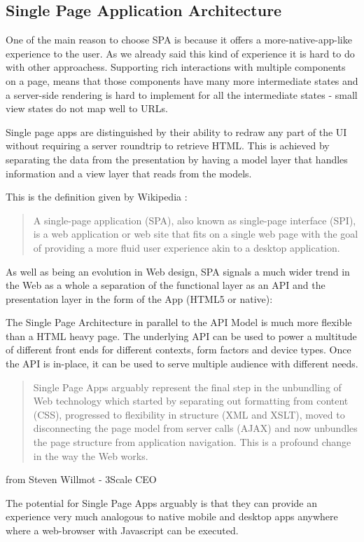 \documentclass[a4paper,13pt]{report}
\begin{document}
\subsection{Single Page Application Architecture}
 One of the main reason to choose SPA is because it offers a more-native-app-like experience to the user. As we already said this kind of experience it is hard to do with other approachess.
 Supporting rich interactions with multiple components on a page, means that those components have many more intermediate states and a server-side rendering is hard to implement for all the intermediate states - small view states do not map well to URLs.

Single page apps are distinguished by their ability to redraw any part of the UI without requiring a server roundtrip to retrieve HTML. This is achieved by separating the data from the presentation by having a model layer that handles information and a view layer that reads from the models.


This is the definition given by Wikipedia \cite{SPAWikipedia}:
\begin{quotation}
A single-page application (SPA), also known as single-page interface (SPI), is a web application or web site that fits on a single web page with the goal of providing a more fluid user experience akin to a desktop application.
\end{quotation}


As well as being an evolution in Web design, SPA signals a much wider trend in the Web as a whole a separation of the functional layer as an API and the presentation layer in the form of the App (HTML5 or native):

The Single Page Architecture in parallel to the API Model is much more flexible than a HTML heavy page. The underlying API can be used to power a multitude of different front ends for different contexts, form factors and device types. Once the API is in-place, it can be used to serve multiple audience with different needs. \newline
\begin{quotation}
Single Page Apps arguably represent the final step in the unbundling of Web technology which started by separating out formatting from content (CSS), progressed to flexibility in structure (XML and XSLT), moved to disconnecting the page model from server calls (AJAX) and now unbundles the page structure from application navigation. This is a profound change in the way the Web works.
\end{quotation}
\begin{flushright}
from Steven Willmot - 3Scale CEO\cite{appification}
\end{flushright}
The potential for Single Page Apps arguably is that they can provide an experience very much analogous to native mobile and desktop apps anywhere where a web-browser with Javascript can be executed.
\end{document}

